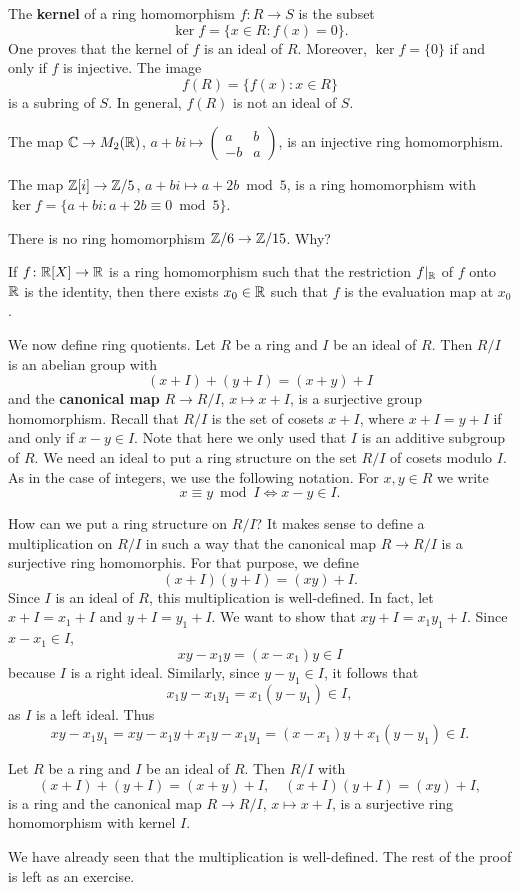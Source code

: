 The \textbf{kernel} of a ring homomorphism
$f\colon R\to S$ is the subset
\[
\ker f=\{x\in R:f(x)=0\}.
\]
One proves that the kernel of $f$ is an ideal of $R$. 
Moreover, $\ker f=\{0\}$ if and only if $f$ is injective. The image 
\[
f(R)=\{f(x):x\in R\}
\]
is a subring of $S$. In general, $f(R)$ is not an ideal of $S$. 

\begin{example}
	The map $\mathbb{C}\to M_2(\mathbb{R})$, $a+bi\mapsto\begin{pmatrix}a&b\\-b&a\end{pmatrix}$, is an injective
	ring homomorphism. 	
\end{example}

\begin{example}
The map $\mathbb{Z}[i]\to\mathbb{Z}/5$, $a+bi\mapsto a+2b\bmod 5$, is a ring homomorphism 
with $\ker f=\{a+bi:a+2b\equiv 0\bmod 5\}$. 	
\end{example}

\begin{exercise}
There is no ring homomorphism $\mathbb{Z}/6\to\mathbb{Z}/15$. Why?	
\end{exercise}

\begin{exercise}
If $f\colon\mathbb{R}[X]\to\mathbb{R}$ is a ring homomorphism 
such that the restriction $f|_{\mathbb{R}}$ of 
$f$ onto $\mathbb{R}$ is the identity, then there exists $x_0\in\mathbb{R}$ such that 
$f$ is the evaluation map at $x_0$. 
\end{exercise}

We now define ring quotients. 
Let $R$ be a ring and $I$ be an ideal of $R$. 
Then $R/I$ is an abelian group
with 
\[
(x+I)+(y+I)=(x+y)+I
\]
and the 
\textbf{canonical map} 
$R\to R/I$, $x\mapsto x+I$,
is a surjective group homomorphism. Recall that 
$R/I$ is the set of cosets $x+I$, where 
$x+I=y+I$ if and only if $x-y\in I$. Note that here we only used
that $I$ is an additive subgroup of $R$. We need an ideal to put a ring structure
on the set $R/I$ of cosets modulo $I$. As in the case of integers, 
we use the following notation. For $x,y\in R$ 
we write 
\[
x\equiv y\bmod I\Longleftrightarrow x-y\in I.
\]

How can we put a ring structure on $R/I$? It makes sense
to define a multiplication on $R/I$ in such a way that
the canonical map $R\to R/I$ is a surjective ring homomorphis. For that purpose, 
we define 
\[
(x+I)(y+I)=(xy)+I.
\]
Since $I$ is an ideal of $R$, this multiplication is well-defined. In fact, let 
$x+I=x_1+I$ and $y+I=y_1+I$. We want to show that
$xy+I=x_1y_1+I$. Since $x-x_1\in I$, 
\[
xy-x_1y=(x-x_1)y\in I
\]
because $I$ is a right ideal. Similarly, since $y-y_1\in I$, it follows that 
\[
x_1y-x_1y_1=x_1(y-y_1)\in I,
\]
as $I$ is a left ideal. Thus
\[
xy-x_1y_1=xy-x_1y+x_1y-x_1y_1=(x-x_1)y+x_1(y-y_1)\in I.
\]

\begin{theorem}
	Let $R$ be a ring and $I$ be an ideal of $R$. Then
	$R/I$ with 
	\[
	(x+I)+(y+I)=(x+y)+I,\quad
	(x+I)(y+I)=(xy)+I,
	\]
	is a ring and the canonical map $R\to R/I$, $x\mapsto x+I$, 
	is a surjective
	ring homomorphism with kernel $I$. 
\end{theorem}

We have already seen that the multiplication is well-defined. The rest
of the proof is left as an exercise. 
